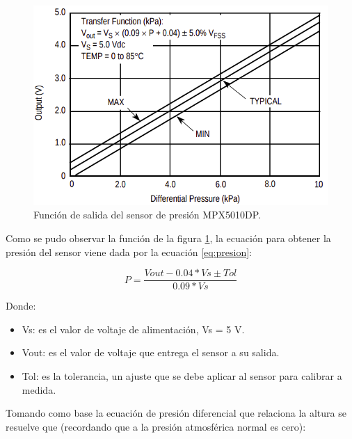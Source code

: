 \begin{figure}[h]
\centering
\includegraphics[scale=.60]{./Figures/SalidaMPX5010DP.png}
\caption{Función de salida del sensor de presión MPX5010DP\protect\footnotemark.}
\label{fig:función de salida del sensor}
\end{figure}


Como se pudo observar la función de la figura \ref{fig:función de salida del sensor}, la ecuación para obtener la presión del sensor viene dada por la ecuación \ref{eq:presion}:

\begin{equation}
 \label{eq:presion}
 P = \frac{Vout- 0.04*Vs \pm Tol}{0.09*Vs}
\end{equation}

\vspace{4cm}

Donde:\\
\begin{itemize}
\item Vs: es el valor de voltaje de alimentación, Vs = 5 V.\\
\item Vout: es el valor de voltaje que entrega el sensor  a su salida.\\
\item Tol: es la tolerancia, un ajuste que se debe aplicar al sensor para  calibrar a medida.
\end{itemize}

Tomando como base la ecuación de presión diferencial que relaciona la altura se resuelve que (recordando que a la presión atmosférica normal es cero):  

